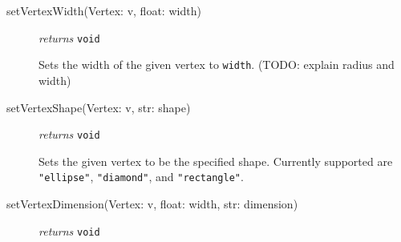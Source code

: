 \documentclass{article}
\begin{document}
\begin{description}
\item[setVertexWidth(Vertex: v, float: width)] \emph{returns}
  \texttt{void}

Sets the width of the given vertex to \texttt{width}. (TODO: explain
radius and width)

\item[setVertexShape(Vertex: v, str: shape)] \emph{returns} \texttt{void}

Sets the given vertex to be the specified shape. Currently supported
are \texttt{"{}ellipse"}, \texttt{"diamond"}, and \texttt{"rectangle"}.
  
\item[setVertexDimension(Vertex: v, float: width, str: dimension)]
  \emph{returns} \texttt{void}

\end{description}
\end{document}
